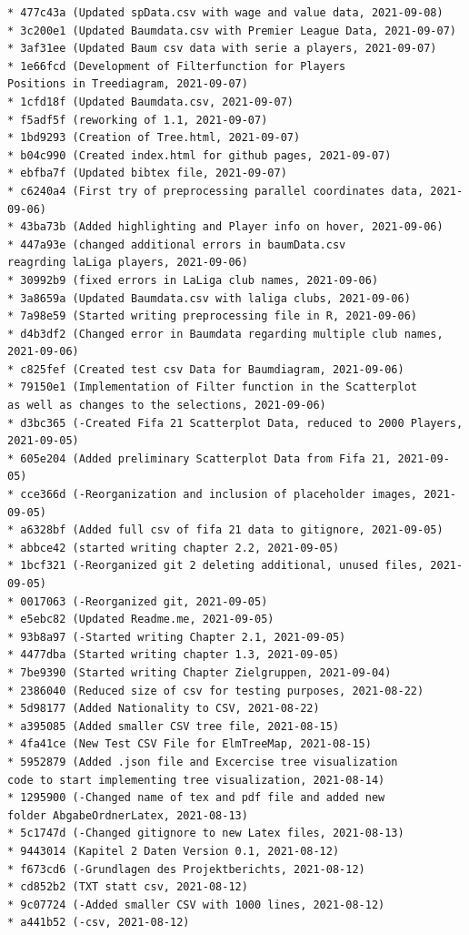 \documentclass[usegeometry=true]{scrartcl}
\begin{document}
\begin{verbatim}
* 477c43a (Updated spData.csv with wage and value data, 2021-09-08)
* 3c200e1 (Updated Baumdata.csv with Premier League Data, 2021-09-07)
* 3af31ee (Updated Baum csv data with serie a players, 2021-09-07)
* 1e66fcd (Development of Filterfunction for Players 
Positions in Treediagram, 2021-09-07)
* 1cfd18f (Updated Baumdata.csv, 2021-09-07)
* f5adf5f (reworking of 1.1, 2021-09-07)
* 1bd9293 (Creation of Tree.html, 2021-09-07)
* b04c990 (Created index.html for github pages, 2021-09-07)
* ebfba7f (Updated bibtex file, 2021-09-07)
* c6240a4 (First try of preprocessing parallel coordinates data, 2021-09-06)
* 43ba73b (Added highlighting and Player info on hover, 2021-09-06)
* 447a93e (changed additional errors in baumData.csv 
reagrding laLiga players, 2021-09-06)
* 30992b9 (fixed errors in LaLiga club names, 2021-09-06)
* 3a8659a (Updated Baumdata.csv with laliga clubs, 2021-09-06)
* 7a98e59 (Started writing preprocessing file in R, 2021-09-06)
* d4b3df2 (Changed error in Baumdata regarding multiple club names, 2021-09-06)
* c825fef (Created test csv Data for Baumdiagram, 2021-09-06)
* 79150e1 (Implementation of Filter function in the Scatterplot 
as well as changes to the selections, 2021-09-06)
* d3bc365 (-Created Fifa 21 Scatterplot Data, reduced to 2000 Players, 2021-09-05)
* 605e204 (Added preliminary Scatterplot Data from Fifa 21, 2021-09-05)
* cce366d (-Reorganization and inclusion of placeholder images, 2021-09-05)
* a6328bf (Added full csv of fifa 21 data to gitignore, 2021-09-05)
* abbce42 (started writing chapter 2.2, 2021-09-05)
* 1bcf321 (-Reorganized git 2 deleting additional, unused files, 2021-09-05)
* 0017063 (-Reorganized git, 2021-09-05)
* e5ebc82 (Updated Readme.me, 2021-09-05)
* 93b8a97 (-Started writing Chapter 2.1, 2021-09-05)
* 4477dba (Started writing chapter 1.3, 2021-09-05)
* 7be9390 (Started writing Chapter Zielgruppen, 2021-09-04)
* 2386040 (Reduced size of csv for testing purposes, 2021-08-22)
* 5d98177 (Added Nationality to CSV, 2021-08-22)
* a395085 (Added smaller CSV tree file, 2021-08-15)
* 4fa41ce (New Test CSV File for ElmTreeMap, 2021-08-15)
* 5952879 (Added .json file and Excercise tree visualization 
code to start implementing tree visualization, 2021-08-14)
* 1295900 (-Changed name of tex and pdf file and added new 
folder AbgabeOrdnerLatex, 2021-08-13)
* 5c1747d (-Changed gitignore to new Latex files, 2021-08-13)
* 9443014 (Kapitel 2 Daten Version 0.1, 2021-08-12)
* f673cd6 (-Grundlagen des Projektberichts, 2021-08-12)
* cd852b2 (TXT statt csv, 2021-08-12)
* 9c07724 (-Added smaller CSV with 1000 lines, 2021-08-12)
* a441b52 (-csv, 2021-08-12)

\end{verbatim}
\end{document}
